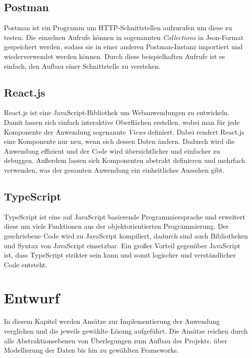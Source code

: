 \documentclass[12pt,twoside,a4paper]{article}
\begin{document}
\begin{sloppypar}
\subsection{Postman}\label{sec:postman}
Postman ist ein Programm um HTTP-Schnittstellen aufzurufen um diese zu testen. Die einzelnen Aufrufe können in sogenannten \textit{Collections} in Json-Format gespeichert werden, sodass sie in einer anderen Postman-Instanz importiert und wiederverwendet werden können. Durch diese beispielhaften Aufrufe ist es einfach, den Aufbau einer Schnittstelle zu verstehen.
\subsection{React.js}\label{sec:react}
React.js ist eine JavaScript-Bibliothek um Webanwendungen zu entwickeln. Damit lassen sich einfach interaktive Oberflächen erstellen, wobei man für jede Komponente der Anwendung sogenannte \textit{Views} definiert. Dabei rendert React.js eine Komponente nur neu, wenn sich dessen Daten ändern. Dadurch wird die Anwendung effizient und der Code wird übersichtlicher und einfacher zu debuggen. Außerdem lassen sich Komponenten abstrakt definieren und mehrfach verwenden, was der gesamten Anwendung ein einheitliches Aussehen gibt. \cite{react}
\subsection{TypeScript}\label{sec:typescript}
TypeScript ist eine auf JavaScript basierende Programmiersprache und erweitert diese um viele Funktionen aus der objektorientierten Programmierung. Der geschriebene Code wird zu JavaScript kompiliert, dadurch sind auch Bibliotheken und Syntax von JavaScript einsetzbar. Ein großer Vorteil gegenüber JavaScript ist, dass TypeScript strikter sein kann und somit logischer und verständlicher Code entsteht. \cite{ts-vs-js}
\newpage
\section{Entwurf}
In diesem Kapitel werden Ansätze zur Implementierung der Anwendung verglichen und die jeweils gewählte Lösung aufgeführt. Die Ansätze reichen durch alle Abstraktionsebenen von Überlegungen zum Aufbau des Projekts, über Modellierung der Daten bis hin zu gewählten Frameworks.

\end{sloppypar}
\end{document}
